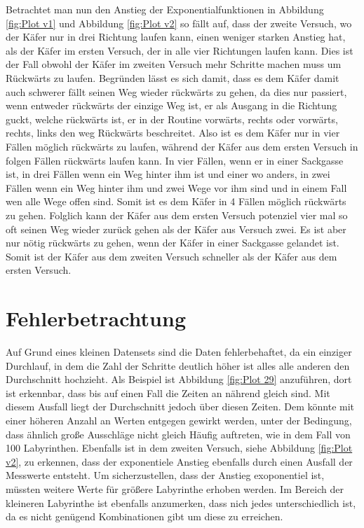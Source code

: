 \documentclass[12pt, a4paper, titlepage]{article}
\begin{document}
\bigskip

Betrachtet man nun den Anstieg der Exponentialfunktionen in Abbildung \ref{fig:Plot v1} und Abbildung \ref{fig:Plot v2} so fällt auf, dass der zweite Versuch, wo der Käfer nur in drei Richtung laufen kann, einen weniger starken Anstieg hat, als der Käfer im ersten Versuch, der in alle vier Richtungen laufen kann.
Dies ist der Fall obwohl der Käfer im zweiten Versuch mehr Schritte machen muss um Rückwärts zu laufen.
Begründen lässt es sich damit, dass es dem Käfer damit auch schwerer fällt seinen Weg wieder rückwärts zu gehen, da dies nur passiert, wenn entweder rückwärts der einzige Weg ist, er als Ausgang in die Richtung guckt, welche rückwärts ist, er in der Routine vorwärts, rechts oder vorwärts, rechts, links den weg Rückwärts beschreitet.
Also ist es dem Käfer nur in vier Fällen möglich rückwärts zu laufen, während der Käfer aus dem ersten Versuch in folgen Fällen rückwärts laufen kann.
In vier Fällen, wenn er in einer Sackgasse ist, in drei Fällen wenn ein Weg hinter ihm ist und einer wo anders, in zwei Fällen wenn ein Weg hinter ihm und zwei Wege vor ihm sind und in einem Fall wen alle Wege offen sind.
Somit ist es dem Käfer in 4 Fällen möglich rückwärts zu gehen.
Folglich kann der Käfer aus dem ersten Versuch potenziel vier mal so oft seinen Weg wieder zurück gehen als der Käfer aus Versuch zwei.
Es ist aber nur nötig rückwärts zu gehen, wenn der Käfer in einer Sackgasse gelandet ist.
Somit ist der Käfer aus dem zweiten Versuch schneller als der Käfer aus dem ersten Versuch.

\section{Fehlerbetrachtung}

Auf Grund eines kleinen Datensets sind die Daten fehlerbehaftet, da ein einziger Durchlauf, in dem die Zahl der Schritte deutlich höher ist alles alle anderen den Durchschnitt hochzieht.
Als Beispiel ist Abbildung \ref{fig:Plot 29} anzuführen, dort ist erkennbar, dass bis auf einen Fall die Zeiten an nährend gleich sind.
Mit diesem Ausfall liegt der Durchschnitt jedoch über diesen Zeiten.
Dem könnte mit einer höheren Anzahl an Werten entgegen gewirkt werden, unter der Bedingung, dass ähnlich große Ausschläge nicht gleich Häufig auftreten, wie in dem Fall von 100 Labyrinthen.
Ebenfalls ist in dem zweiten Versuch, siehe Abbildung \ref{fig:Plot v2}, zu erkennen, dass der exponentiele Anstieg ebenfalls durch einen Ausfall der Messwerte entsteht.
Um sicherzustellen, dass der Anstieg exoponentiel ist, müssten weitere Werte für größere Labyrinthe erhoben werden.
Im Bereich der kleineren Labyrinthe ist ebenfalls anzumerken, dass nich jedes unterschiedlich ist, da es nicht genügend Kombinationen gibt um diese zu erreichen.
\end{document}
